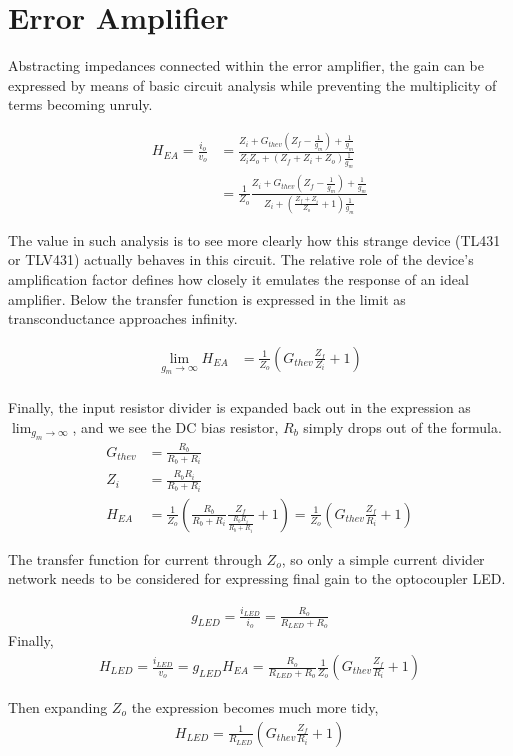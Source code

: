 \documentclass{scrartcl}
\begin{document}
\section{Error Amplifier}

Abstracting impedances connected within the error amplifier, the gain can be expressed by means of basic circuit analysis while preventing the multiplicity of terms becoming unruly.

	\begin{align}
		H_{EA} = \frac{i_o}{v_o} &= \frac{ Z_i + G_{thev}(Z_f - \frac{1}{g_m}) +  \frac{1}{g_m} } {Z_i Z_o + (Z_f + Z_i + Z_o)\frac{1}{g_m}} \\
		 &= \frac{1}{Z_o} \frac{ Z_i + G_{thev}(Z_f - \frac{1}{g_m}) +  \frac{1}{g_m} } {Z_i + ( \frac{Z_f + Z_i}{Z_o} + 1)\frac{1}{g_m}}
	\end{align}
	
	The value in such analysis is to see more clearly how this strange device (TL431 or TLV431) actually behaves in this circuit.  The relative role of the device's amplification factor defines how closely it emulates the response of an ideal amplifier.  Below the transfer function is expressed in the limit as transconductance approaches infinity.
	
	\begin{align}
		\lim_{g_m \to \infty} H_{EA} &= \frac{1}{Z_o} (G_{thev} \frac{Z_f }{Z_i} + 1) \label{lim_Hea} \\
	\end{align}
	
	Finally, the input resistor divider is expanded back out in the expression as $\lim_{g_m \to \infty}$, and we see the DC bias resistor, $R_b$ simply drops out of the formula.
	\begin{align}
		G_{thev} &= \frac{R_b}{R_b+R_i}\\
		Z_i &= \frac{R_b R_i}{R_b + R_i}\\
		H_{EA} &= \frac{1}{Z_o} (\frac{R_b}{R_b+R_i} \frac{Z_f }{\frac{R_b R_i}{R_b + R_i}} + 1) = \frac{1}{Z_o} (G_{thev} \frac{Z_f }{R_i} + 1)
	\end{align}
	
	The transfer function for current through $Z_o$, so only a simple current divider network needs to be considered for expressing final gain to the optocoupler LED.
	
	\begin{align}
		g_{LED} = \frac{i_{LED}}{i_o} = \frac{R_o}{R_{LED} + R_o}
	\end{align}
	Finally,
	\begin{align}
		H_{LED} = \frac{i_{LED}} {v_o} = g_{LED} H_{EA} = \frac{R_o}{R_{LED} + R_o} \frac{1}{Z_o} (G_{thev} \frac{Z_f }{R_i} + 1)
	\end{align}
	
	Then expanding $Z_o$ the expression becomes much more tidy,
	\begin{align}
		H_{LED} = \frac{1}{R_{LED}} (G_{thev} \frac{Z_f }{R_i} + 1)
	\end{align} 
	
\end{document}
